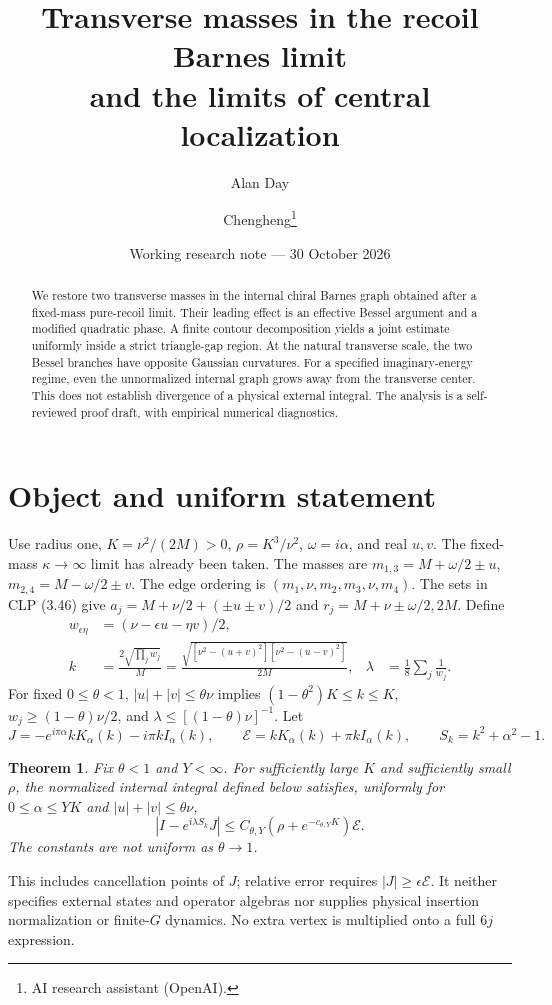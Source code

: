 \documentclass[11pt,a4paper]{article}
\title{Transverse masses in the recoil Barnes limit\\and the limits of central localization}
\author{Alan Day \and Chengheng\thanks{AI research assistant (OpenAI).}}
\date{Working research note --- 30 October 2026}
\newtheorem{theorem}{Theorem}
\newcommand{\E}{\mathcal E}
\begin{document}
\maketitle
\begin{abstract}
We restore two transverse masses in the internal chiral Barnes graph
obtained after a fixed-mass pure-recoil limit. Their leading effect is
an effective Bessel argument and a modified quadratic phase.
A finite contour decomposition yields a joint estimate uniformly
inside a strict triangle-gap region. At the natural transverse scale,
the two Bessel branches have opposite Gaussian curvatures.
For a specified imaginary-energy regime, even the unnormalized internal
graph grows away from the transverse center. This does not establish
divergence of a physical external integral. The analysis is a
self-reviewed proof draft, with empirical numerical diagnostics.
\end{abstract}
\section{Object and uniform statement}
Use radius one, \(K=\nu^2/(2M)>0\), \(\rho=K^3/\nu^2\),
\(\omega=i\alpha\), and real \(u,v\). The fixed-mass \(\kappa\to\infty\)
limit has already been taken. The masses are
\(m_{1,3}=M+\omega/2\pm u\), \(m_{2,4}=M-\omega/2\pm v\).
The edge ordering is \((m_1,\nu,m_2,m_3,\nu,m_4)\).
The sets in CLP (3.46) \cite{clp} give
\(a_j=M+\nu/2+(\pm u\pm v)/2\) and
\(r_j=M+\nu\pm\omega/2,2M\).
Define
\begin{align}
 w_{\epsilon\eta}&=(\nu-\epsilon u-\eta v)/2,\\
 k&=\frac{2\sqrt{\prod_j w_j}}{M}
 =\frac{\sqrt{[\nu^2-(u+v)^2][\nu^2-(u-v)^2]}}{2M},&
 \lambda&=\frac18\sum_j\frac1{w_j}.
\end{align}
For fixed \(0\le\theta<1\), \(|u|+|v|\le\theta\nu\) implies
\((1-\theta^2)K\le k\le K\), \(w_j\ge(1-\theta)\nu/2\),
and \(\lambda\le[(1-\theta)\nu]^{-1}\).
Let
\[
 J=-e^{i\pi\alpha}kK_\alpha(k)-i\pi kI_\alpha(k),\qquad
 \E=kK_\alpha(k)+\pi kI_\alpha(k),\qquad S_k=k^2+\alpha^2-1.
\]
\begin{theorem}
Fix \(\theta<1\) and \(Y<\infty\). For sufficiently large \(K\) and
sufficiently small \(\rho\), the normalized internal integral defined
below satisfies, uniformly for \(0\le\alpha\le YK\) and
\(|u|+|v|\le\theta\nu\),
\[
 |I-e^{i\lambda S_k}J|\le C_{\theta,Y}
       (\rho+e^{-c_{\theta,Y}K})\E .
\]
The constants are not uniform as \(\theta\to1\).
\end{theorem}
This includes cancellation points of \(J\); relative error requires
\(|J|\ge\epsilon\E\). It neither specifies external states and operator
algebras nor supplies physical insertion normalization or finite-\(G\)
dynamics. No extra vertex is multiplied onto a full \(6j\) expression.
\end{document}
